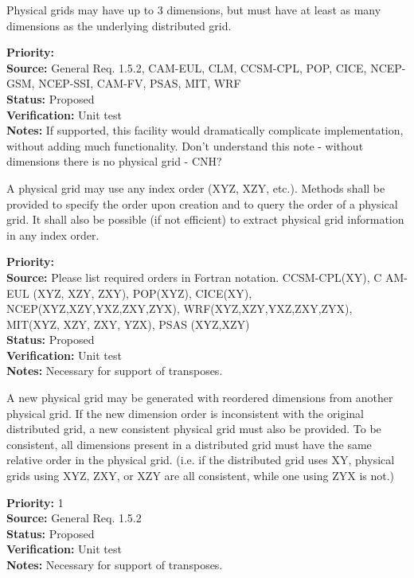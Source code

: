 Physical grids may have up to 3 dimensions, but must have at least as many dimensions as the
underlying distributed grid. 
\begin{reqlist}
{\bf Priority:}  \\
{\bf Source:} General Req. 1.5.2, CAM-EUL, CLM, CCSM-CPL, POP, CICE, NCEP-GSM, NCEP-SSI,
              CAM-FV, PSAS, MIT, WRF \\
{\bf Status:} Proposed \\
{\bf Verification:} Unit test\\
{\bf Notes:} If supported, this facility would dramatically complicate implementation,
without adding much functionality. Don't understand this note - without dimensions
there is no physical grid - CNH?
\end{reqlist}

A physical grid may use any index order (XYZ, XZY, etc.).  Methods shall be provided to
specify the order upon creation and to query the order of a physical grid.  It shall
also be possible (if not efficient) to extract physical grid information in any index
order.
\begin{reqlist}
{\bf Priority:}  \\
{\bf Source:} Please list required orders in Fortran notation. CCSM-CPL(XY), C
AM-EUL (XYZ, XZY, ZXY), POP(XYZ), CICE(XY), NCEP(XYZ,XZY,YXZ,ZXY,ZYX), 
WRF(XYZ,XZY,YXZ,ZXY,ZYX),
MIT(XYZ, XZY, ZXY, YZX),
PSAS (XYZ,XZY) \\
{\bf Status:} Proposed \\
{\bf Verification:} Unit test\\
{\bf Notes:} Necessary for support of transposes.
\end{reqlist}

A new physical grid may be generated with reordered dimensions from another physical grid.
If the new dimension order is inconsistent with the original distributed grid, a new
consistent physical grid must also be provided.  To be consistent, all dimensions present
in a distributed grid must have the same relative order in the physical grid.  (i.e. if the
distributed grid uses XY, physical grids using XYZ, ZXY, or XZY are all consistent, while one using
ZYX is not.)
\begin{reqlist}
{\bf Priority:} 1 \\
{\bf Source:} General Req. 1.5.2 \\
{\bf Status:} Proposed \\
{\bf Verification:} Unit test\\
{\bf Notes:} Necessary for support of transposes.
\end{reqlist}

